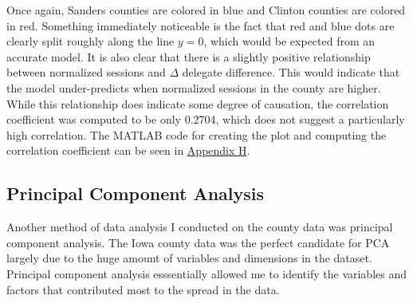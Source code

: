 \documentclass[11pt]{article}
\begin{document}
\begin{multicols}{2}

Once again, Sanders counties are colored in blue and Clinton counties are colored in red. Something immediately noticeable is the fact that red and blue dots are clearly split roughly along the line $y = 0$, which would be expected from an accurate model. It is also clear that there is a slightly positive relationship between normalized sessions and $\Delta$ delegate difference. This would indicate that the model under-predicts when normalized sessions in the county are higher. While this relationship does indicate some degree of causation, the correlation coefficient was computed to be only 0.2704, which does not suggest a particularly high correlation. The MATLAB code for creating the plot and computing the correlation coefficient can be seen in \underline{Appendix H}.\\

\subsection{Principal Component Analysis}

Another method of data analysis I conducted on the county data was principal component analysis. The Iowa county data was the perfect candidate for PCA largely due to the huge amount of variables and dimensions in the dataset. Principal component analysis esssentially allowed me to identify the variables and factors that contributed most to the spread in the data. \\

\end{multicols}
\end{document}
